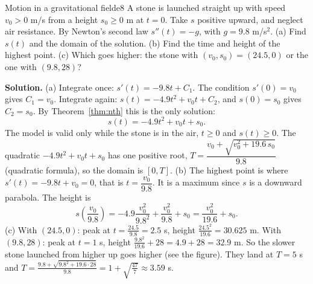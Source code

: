 \documentclass[11pt]{article}
\begin{document}
\begin{exmp}{Motion in a gravitational field}{e8}
A stone is launched straight up with speed $v_0>0$ m/s from a height $s_0\ge0$ m at $t=0$. Take $s$ positive upward, and neglect air resistance. By Newton's second law $s''(t)=-g$, with $g=9.8$ m/s$^2$. (a) Find $s(t)$ and the domain of the solution. (b) Find the time and height of the highest point. (c) Which goes higher: the stone with $(v_0,s_0)=(24.5,0)$ or the one with $(9.8,28)$?

\textbf{Solution.} (a) Integrate once: $s'(t)=-9.8t+C_1$. The condition $s'(0)=v_0$ gives $C_1=v_0$. Integrate again: $s(t)=-4.9t^2+v_0t+C_2$, and $s(0)=s_0$ gives $C_2=s_0$. By Theorem~\ref{thm:nth} this is the only solution:
\[
s(t)=-4.9t^2+v_0t+s_0 .
\]
The model is valid only while the stone is in the air, $t\ge0$ and $s(t)\ge0$. The quadratic $-4.9t^2+v_0t+s_0$ has one positive root, $T=\dfrac{v_0+\sqrt{v_0^2+19.6\,s_0}}{9.8}$ (quadratic formula), so the domain is $[0,T]$.
(b) The highest point is where $s'(t)=-9.8t+v_0=0$, that is $t=\dfrac{v_0}{9.8}$. It is a maximum since $s$ is a downward parabola. The height is
\[
s\!\left(\frac{v_0}{9.8}\right)=-4.9\frac{v_0^2}{9.8^2}+\frac{v_0^2}{9.8}+s_0=\frac{v_0^2}{19.6}+s_0 .
\]
(c) With $(24.5,0)$: peak at $t=\frac{24.5}{9.8}=2.5$ s, height $\frac{24.5^2}{19.6}=30.625$ m. With $(9.8,28)$: peak at $t=1$ s, height $\frac{9.8^2}{19.6}+28=4.9+28=32.9$ m. So the slower stone launched from higher up goes higher (see the figure). They land at $T=5$ s and $T=\frac{9.8+\sqrt{9.8^2+19.6\cdot28}}{9.8}=1+\sqrt{\frac{47}7}\approx3.59$ s.


\end{exmp}
\end{document}
